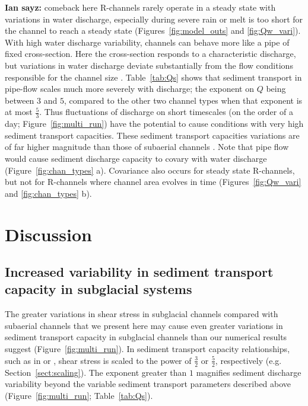 \documentclass[tc, manuscript]{copernicus}
\newcommand{\ian}[1]{{\textbf{\color{blue}Ian sayz:} \color{blue} #1} }
\newcommand{\alpine}{\textit{ALPINE}\,}
\begin{document}
\ian{comeback here}
R-channels rarely operate in a steady state with variations in water discharge, especially during severe rain or melt is too short for the channel to reach a steady state (Figures~\ref{fig:model_outs} and \ref{fig:Qw_vari}).
With high water discharge variability, channels can behave more like a pipe of fixed cross-section. Here the cross-section responds to a characteristic discharge, but variations in water discharge deviate substantially from the flow conditions responsible for the channel size \citep[i.e. diurnal water discharge variations in \alpine{} case Figure \ref{fig:Qw_vari}; e.g.][]{gimbert2016}.
Table~\ref{tab:Qs} shows that sediment transport in pipe-flow scales much more severely with discharge; the exponent on $Q$ being between $3$ and $5$, compared to the other two channel types when that exponent is at most $\frac{5}{3}$.
Thus fluctuations of discharge on short timescales (on the order of a day; Figure~\ref{fig:multi_run}) have the potential to cause conditions with very high sediment transport capacities.
These sediment transport capacities variations are of far higher magnitude than those of subaerial channels \citep[][]{alley1997}.
Note that pipe flow would cause sediment discharge capacity to covary with water discharge (Figure~\ref{fig:chan_types} a).
Covariance also occurs for steady state R-channels, but not for R-channels where channel area evolves in time (Figures~\ref{fig:Qw_vari} and \ref{fig:chan_types} b).

\FloatBarrier
\section{Discussion}

\subsection{Increased variability in  sediment transport capacity in subglacial systems}
\label{sect:dis_qsc}

The greater variations in shear stress in subglacial channels compared with subaerial channels that we present here may cause even greater variations in sediment transport capacity in subglacial channels than our numerical results suggest  (Figure~\ref{fig:multi_run}).
In sediment transport capacity relationships, such as in \citet{meyer1948} or \citet{engelund1967}, shear stress is scaled to the power of $\frac{3}{2}$ or $\frac{5}{2}$, respectively (e.g. Section~\ref{sect:scaling}).
The exponent greater than $1$ magnifies sediment discharge variability beyond the variable sediment transport parameters described above (Figure~\ref{fig:multi_run}; Table~\ref{tab:Qs}).
\end{document}
